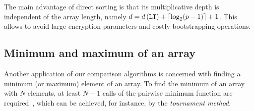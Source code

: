 	The main advantage of direct sorting is that its multiplicative depth is independent of the array length, namely $d = d\left(\mathtt{LT}\right) + \left\lceil \log_2 (p-1) \right\rceil + 1$.
	This allows to avoid large encryption parameters and costly bootstrapping operations.

\subsection{Minimum and maximum of an array}
\label{sec:min/max}

	Another application of our comparison algorithms is concerned with finding a minimum (or maximum) element of an array.
	To find the minimum of an array with $N$ elements, at least $N-1$ calls of the pairwise minimum function are required~\cite[Chapter 9]{CLR09}, which can be achieved, for instance, by the \emph{tournament method}.
	
